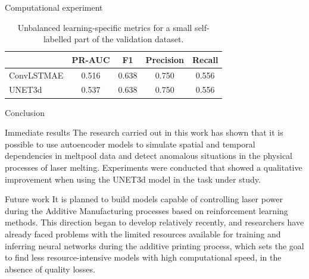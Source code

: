 \documentclass{beamer}
\begin{document}
\begin{frame}{Computational experiment}
    \begin{table}[]
    \centering
    \begin{tabular}{|l||c|c|c|c|}
    \hline
    & PR-AUC & F1    & Precision & Recall \\ \hline\hline
    ConvLSTMAE & 0.516  & 0.638 & 0.750     & 0.556  \\ \hline
    UNET3d & 0.537  & 0.638 & 0.750     & 0.556  \\ \hline
    \end{tabular}
    \caption{Unbalanced learning-specific metrics for a small self-labelled part of the validation dataset.}
    \label{tab:sup_metrics}
    \end{table}
\end{frame}
\begin{frame}{Conclusion}
    \begin{block}{Immediate results}
        The research carried out in this work has shown that it is possible to use autoencoder models to simulate spatial and temporal dependencies in meltpool data and detect anomalous situations in the physical processes of laser melting. Experiments were conducted that showed a qualitative improvement when using the UNET3d model in the task under study.
    \end{block}
    
    \begin{block}{Future work}
        It is planned to build models capable of controlling laser power during the Additive Manufacturing processes based on reinforcement learning methods. This direction began to develop relatively recently, and researchers have already faced problems with the limited resources available for training and inferring neural networks during the additive printing process, which sets the goal to find less resource-intensive models with high computational speed, in the absence of quality losses.
    \end{block}
\end{frame}
\end{document}
